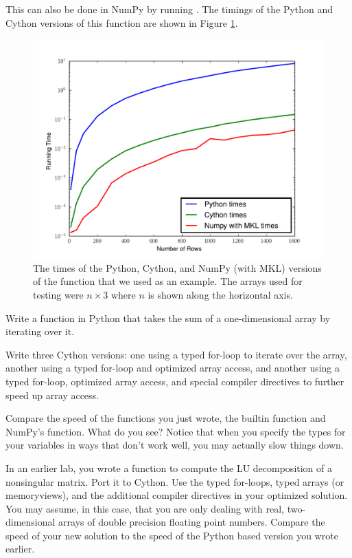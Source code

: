 This can also be done in NumPy by running .
The timings of the Python and Cython versions of this function are shown in Figure \ref{cython:rowdot}.

\begin{figure}
\centering
\includegraphics[width=\textwidth]{rowdot.pdf}
\caption{The times of the Python, Cython, and NumPy (with MKL) versions of the  function that we used as an example.
The arrays used for testing were $n\times 3$ where $n$ is shown along the horizontal axis.}
\label{cython:rowdot}
\end{figure}

\begin{problem}
Write a function in Python that takes the sum of a one-dimensional array by iterating over it.

Write three Cython versions: one using a typed for-loop to iterate over the array, another using a typed for-loop and optimized array access, and another using a typed for-loop, optimized array access, and special compiler directives to further speed up array access.

Compare the speed of the functions you just wrote, the builtin  function and NumPy's  function.
What do you see?
Notice that when you specify the types for your variables in ways that don't work well, you may actually slow things down.
\end{problem}

\begin{problem}
In an earlier lab, you wrote a function to compute the LU decomposition of a nonsingular matrix.
Port it to Cython.
Use the typed for-loops, typed arrays (or memoryviews), and the additional compiler directives in your optimized solution.
You may assume, in this case, that you are only dealing with real, two-dimensional arrays of double precision floating point numbers.
Compare the speed of your new solution to the speed of the Python based version you wrote earlier.
\end{problem}

